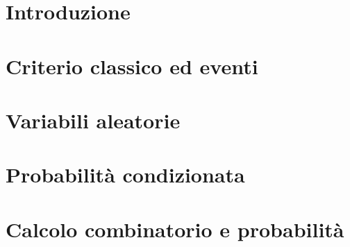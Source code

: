 \documentclass[12pt]{article}
\begin{document}


\tableofcontents
\restoregeometry

\section{Introduzione}


\section{Criterio classico ed eventi}


\section{Variabili aleatorie}


\section{Probabilità condizionata}


\section{Calcolo combinatorio e probabilità}

\end{document}
